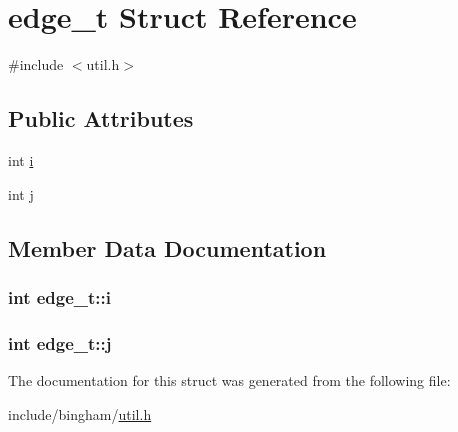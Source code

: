 \hypertarget{structedge__t}{
\section{edge\_\-t Struct Reference}
\label{structedge__t}
}


{\ttfamily \#include $<$util.h$>$}

\subsection*{Public Attributes}
\begin{DoxyCompactItemize}
\item 
int \hyperlink{structedge__t_ad7a1f8ef33df7d97e109e2c8cc0a7061}{i}
\item 
int \hyperlink{structedge__t_a94935293ccdd44ec33d8961b7dac7780}{j}
\end{DoxyCompactItemize}


\subsection{Member Data Documentation}
\hypertarget{structedge__t_ad7a1f8ef33df7d97e109e2c8cc0a7061}{
\subsubsection[{i}]{\setlength{\rightskip}{0pt plus 5cm}int {\bf edge\_\-t::i}}}
\label{structedge__t_ad7a1f8ef33df7d97e109e2c8cc0a7061}
\hypertarget{structedge__t_a94935293ccdd44ec33d8961b7dac7780}{
\subsubsection[{j}]{\setlength{\rightskip}{0pt plus 5cm}int {\bf edge\_\-t::j}}}
\label{structedge__t_a94935293ccdd44ec33d8961b7dac7780}


The documentation for this struct was generated from the following file:\begin{DoxyCompactItemize}
\item 
include/bingham/\hyperlink{util_8h}{util.h}\end{DoxyCompactItemize}
